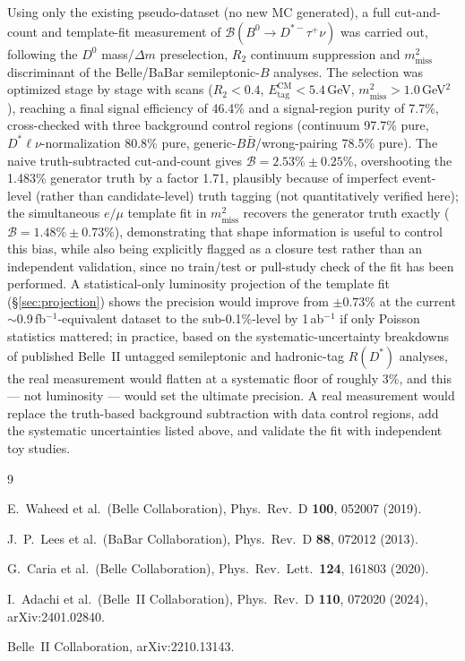\documentclass[11pt]{article}
\newcommand{\mmiss}{m^2_{\mathrm{miss}}}
\newcommand{\BF}{\mathcal{B}}
\newcommand{\Etag}{E_{\mathrm{tag}}^{\mathrm{CM}}}
\begin{document}
Using only the existing pseudo-dataset (no new MC generated), a full
cut-and-count and template-fit measurement of
$\BF(B^0\to D^{*-}\tau^{+}\nu)$ was carried out, following the $D^0$
mass/$\Delta m$ preselection, $R_2$ continuum suppression and $\mmiss$
discriminant of the Belle/BaBar semileptonic-$B$ analyses. The selection
was optimized stage by stage with scans ($R_2 < 0.4$,
$\Etag < 5.4$\,GeV, $\mmiss > 1.0$\,GeV$^2$), reaching a final signal
efficiency of 46.4\% and a signal-region purity of 7.7\%, cross-checked
with three background control regions (continuum 97.7\% pure,
$D^{*}\ell\nu$-normalization 80.8\% pure, generic-$B\bar B$/wrong-pairing
78.5\% pure). The naive truth-subtracted cut-and-count gives
$\BF = 2.53\% \pm 0.25\%$, overshooting the 1.483\% generator truth by a
factor 1.71, plausibly because of imperfect event-level (rather than
candidate-level) truth tagging (not quantitatively verified here); the
simultaneous $e/\mu$ template fit in $\mmiss$ recovers the generator
truth exactly ($\BF = 1.48\% \pm 0.73\%$), demonstrating that shape
information is useful to control this bias, while also being explicitly
flagged as a closure test rather than an independent validation, since no
train/test or pull-study check of the fit has been performed. A
statistical-only luminosity projection of the template fit
(\S\ref{sec:projection}) shows the precision would improve from
$\pm 0.73\%$ at the current $\sim$0.9\,fb$^{-1}$-equivalent dataset to
the sub-0.1\%-level by 1\,ab$^{-1}$ if only Poisson statistics mattered;
in practice, based on the systematic-uncertainty breakdowns of published
Belle~II untagged semileptonic and hadronic-tag $R(D^{*})$ analyses, the
real measurement would flatten at a systematic floor of roughly 3\%, and
this --- not luminosity --- would set the ultimate precision. A real
measurement would replace the truth-based background subtraction with
data control regions, add the systematic uncertainties listed above, and
validate the fit with independent toy studies.

\begin{thebibliography}{9}

E.~Waheed et al.\ (Belle Collaboration),
Phys.\ Rev.\ D \textbf{100}, 052007 (2019).

J.~P.~Lees et al.\ (BaBar Collaboration),
Phys.\ Rev.\ D \textbf{88}, 072012 (2013).

G.~Caria et al.\ (Belle Collaboration),
Phys.\ Rev.\ Lett.\ \textbf{124}, 161803 (2020).

I.~Adachi et al.\ (Belle~II Collaboration),
Phys.\ Rev.\ D \textbf{110}, 072020 (2024), arXiv:2401.02840.

Belle~II Collaboration, arXiv:2210.13143.

\end{thebibliography}
\end{document}
